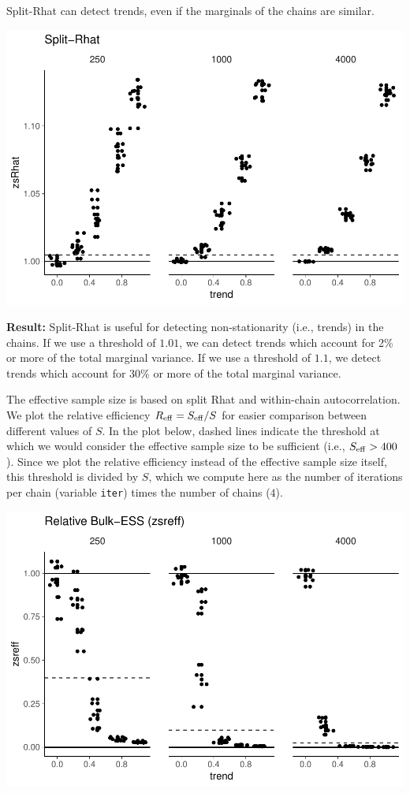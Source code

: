 \documentclass[american,]{article}
\begin{document}
Split-Rhat can detect trends, even if the marginals of the chains are
similar.

\includegraphics{graphics/zsrhat-same-trend-1.pdf}

\textbf{Result:} Split-Rhat is useful for detecting non-stationarity
(i.e., trends) in the chains. If we use a threshold of \(1.01\), we can
detect trends which account for 2\% or more of the total marginal
variance. If we use a threshold of \(1.1\), we detect trends which
account for 30\% or more of the total marginal variance.

The effective sample size is based on split Rhat and within-chain
autocorrelation. We plot the relative efficiency
\(R_{\rm eff}=S_{\rm eff}/S\) for easier comparison between different
values of \(S\). In the plot below, dashed lines indicate the threshold
at which we would consider the effective sample size to be sufficient
(i.e., \(S_{\rm eff} > 400\)). Since we plot the relative efficiency
instead of the effective sample size itself, this threshold is divided
by \(S\), which we compute here as the number of iterations per chain
(variable \texttt{iter}) times the number of chains (\(4\)).

\includegraphics{graphics/zsreff-same-trend-1.pdf}
\end{document}
